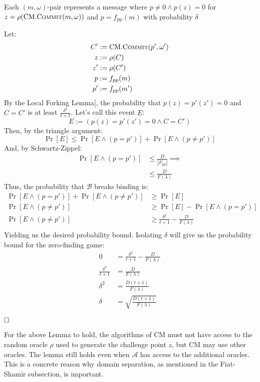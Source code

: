 \documentclass[
]{article}
\newcommand*\Ac{\mathcal{A}}
\newcommand*\Bc{\mathcal{B}}
\renewcommand*\d{\delta}
\renewcommand*\o{\omega}
\newcommand{\qed}{\hfill \ensuremath{\Box}}
\newcommand*{\pp}{\mathrm{pp}}
\newcommand*{\Commit}{\mathrm{\text{C{\scriptsize OMMIT}}}}
\newcommand*{\CM}{\mathrm{\text{CM}}}
\newcommand*{\CMCommit}{\CM.\Commit}
\begin{document}
Each \((m, \o)\)-pair represents a message where
\(p \neq 0 \land p(z) = 0\) for \(z = \rho(\CMCommit(m, \o))\) and
\(p = f_\pp(m)\) with probability \(\d\)

Let: \[
\begin{aligned}
  C' &:= \CMCommit(p', \o') \\
  z  &:= \rho(C) \\
  z' &:= \rho(C') \\
  p  &:= f_{pp}(m) \\
  p' &:= f_{pp}(m')
\end{aligned}
\] By the Local Forking Lemma{[}\citeproc{ref-forking-lemma}{Bellare et
al. 2019}{]}, the probability that \(p(z) =
p'(z') = 0\) and \(C = C'\) is at least \(\frac{\d^2}{t + 1}\). Let's
call this event \(E\): \[E := (p(z) = p'(z') = 0 \land C = C')\] Then,
by the triangle argument: \[
\Pr[E] \leq \Pr[E \land (p = p')] + \Pr[E \land (p \neq p')]
\] And, by Schwartz-Zippel: \[
\begin{aligned}
\Pr[E \land (p = p')] &\leq \frac{D}{|F_\pp|} \implies \\
                      &\leq \frac{D}{F(\lambda)}
\end{aligned}
\] Thus, the probability that \(\Bc\) breaks binding is: \[
\begin{aligned}
\Pr[E \land (p = p')] + \Pr[E \land (p \neq p')] &\geq \Pr[E] \\
\Pr[E \land (p \neq p')] &\geq \Pr[E] - \Pr[E \land (p = p')] \\
\Pr[E \land (p \neq p')] &\geq \frac{\d^2}{t + 1} - \frac{D}{F(\lambda)} \\
\end{aligned}
\] Yielding us the desired probability bound. Isolating \(\d\) will give
us the probability bound for the zero-finding game: \[
\begin{aligned}
  0 &= \frac{\delta^2}{t + 1} - \frac{D}{F(\lambda)} \\
  \frac{\delta^2}{t + 1} &= \frac{D}{F(\lambda)} \\
  \delta^2 &= \frac{D(t + 1)}{F(\lambda)} \\
  \delta &= \sqrt{\frac{D(t + 1)}{F(\lambda)}}
\end{aligned}
\]

\(\qed\)

For the above Lemma to hold, the algorithms of \(\CM\) must not have
access to the random oracle \(\rho\) used to generate the challenge
point \(z\), but \(\CM\) may use other oracles. The lemma still holds
even when \(\Ac\) has access to the additional oracles. This is a
concrete reason why domain separation, as mentioned in the Fiat-Shamir
subsection, is important.
\end{document}
